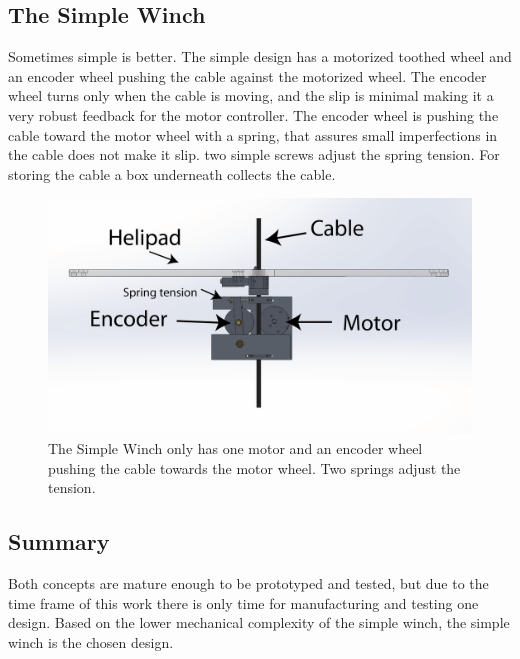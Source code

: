 
\subsection{The Simple Winch}
Sometimes simple is better. The simple design has a motorized toothed wheel and an encoder wheel pushing the cable against the motorized wheel. The encoder wheel turns only when the cable is moving, and the slip is minimal making it a very robust feedback for the motor controller. The encoder wheel is pushing the cable toward the motor wheel with a spring, that assures small imperfections in the cable does not make it slip. two simple screws adjust the spring tension. For storing the cable a box underneath collects the cable.

\begin{figure}[H]
\centering
\includegraphics[scale=0.75]{graphics/cad/winch.png}
\caption{The Simple Winch only has one motor and an encoder wheel pushing the cable towards the motor wheel. Two springs adjust the tension.}
\label{fig:winch}
\end{figure}

\subsection{Summary}
Both concepts are mature enough to be prototyped and tested, but due to the time frame of this work there is only time for manufacturing and testing one design. Based on the lower mechanical complexity of the simple winch, the simple winch is the chosen design.    


